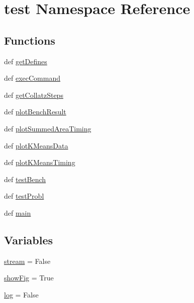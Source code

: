 \hypertarget{namespacetest}{\section{test Namespace Reference}
\label{namespacetest}
}
\subsection*{Functions}
\begin{DoxyCompactItemize}
\item 
def \hyperlink{namespacetest_ace2ff9b6411fb7f53d2e7a9ba4c5c9f2}{get\-Defines}
\item 
def \hyperlink{namespacetest_a098678d6a72d5c8a14a5bedd5c8001eb}{exec\-Command}
\item 
def \hyperlink{namespacetest_aee1e116eba816a3e0e2ab0ca0005394c}{get\-Collatz\-Steps}
\item 
def \hyperlink{namespacetest_a88c793ab9a15183b7237639cd40b9e05}{plot\-Bench\-Result}
\item 
def \hyperlink{namespacetest_a11c961319103606ec35a713816263462}{plot\-Summed\-Area\-Timing}
\item 
def \hyperlink{namespacetest_a1e55b604d47afd58212125650a9e1167}{plot\-K\-Means\-Data}
\item 
def \hyperlink{namespacetest_a5784a470e71e286b979cec38cea44d4f}{plot\-K\-Means\-Timing}
\item 
def \hyperlink{namespacetest_a76d90a0aab7ab2b6325dab5e867428ae}{test\-Bench}
\item 
def \hyperlink{namespacetest_a83af8297288ba2507263c407245dbcbc}{test\-Probl}
\item 
def \hyperlink{namespacetest_aad79eb47bf4d6f10c684cad8600bca58}{main}
\end{DoxyCompactItemize}
\subsection*{Variables}
\begin{DoxyCompactItemize}
\item 
\hyperlink{namespacetest_aa431df7dbaafcd3f706b25f1c726c45f}{stream} = False
\item 
\hyperlink{namespacetest_aef8a79868edc9aae73020d9d611ac16b}{show\-Fig} = True
\item 
\hyperlink{namespacetest_a6d186759eb2a1c9f3384437a6c2f0bab}{log} = False
\end{DoxyCompactItemize}


